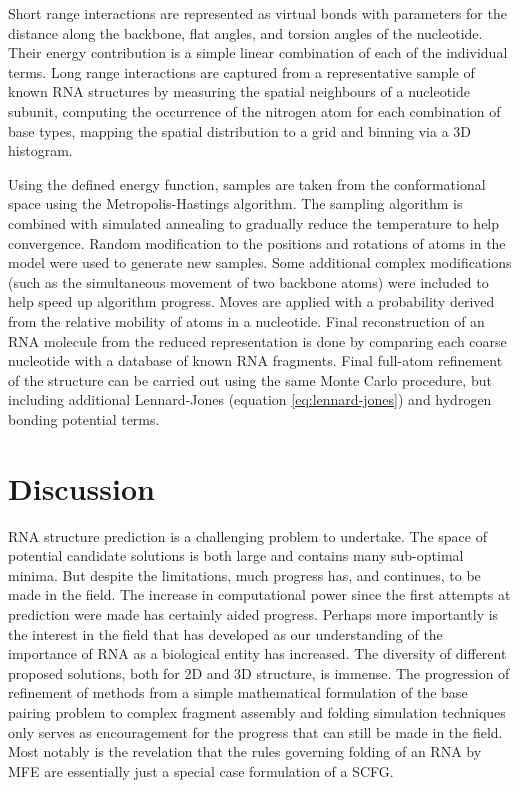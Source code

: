 \documentclass[journal]{IEEEtran}
\begin{document}
Short range interactions are represented as virtual bonds with parameters for the distance along the backbone, flat angles, and torsion angles of the nucleotide. Their energy contribution is a simple linear combination of each of the individual terms. Long range interactions are captured from a representative sample of known RNA structures by measuring the spatial neighbours of a nucleotide subunit, computing the occurrence of the nitrogen atom for each combination of base types, mapping the spatial distribution to a grid and binning via a 3D histogram. 

Using the defined energy function, samples are taken from the conformational space using the Metropolis-Hastings algorithm. The sampling algorithm is combined with simulated annealing to gradually reduce the temperature to help convergence. Random modification to the positions and rotations of atoms in the model were used to generate new samples. Some additional complex modifications (such as the simultaneous movement of two backbone atoms) were included to help speed up algorithm progress. Moves are applied with a probability derived from the relative mobility of atoms in a nucleotide. Final reconstruction of an RNA molecule from the reduced representation is done by comparing each coarse nucleotide with a database of known RNA fragments. Final full-atom refinement of the structure can be carried out using the same Monte Carlo procedure, but including additional Lennard-Jones (equation \ref{eq:lennard-jones}) and hydrogen bonding potential terms.

\section{Discussion}
\label{sec:discussion}
RNA structure prediction is a challenging problem to undertake. The space of potential candidate solutions is both large and contains many sub-optimal minima. But despite the limitations, much progress has, and continues, to be made in the field. The increase in computational power since the first attempts at prediction were made has certainly aided progress. Perhaps more importantly is the interest in the field that has developed as our understanding of the importance of RNA as a biological entity has increased. The diversity of different proposed solutions, both for 2D and 3D structure, is immense. The progression of refinement of methods from a simple mathematical formulation of the base pairing problem to complex fragment assembly and folding simulation techniques only serves as encouragement for the progress that can still be made in the field. Most notably is the revelation that the rules governing folding of an RNA by MFE are essentially just a special case formulation of a SCFG.
\end{document}
